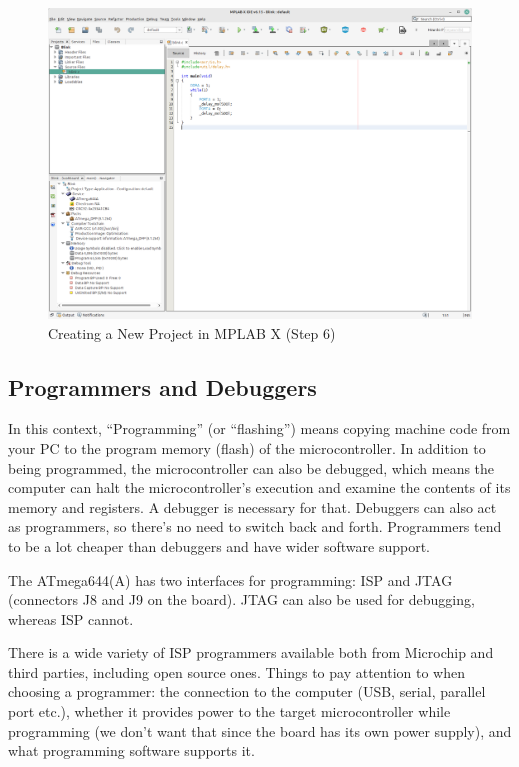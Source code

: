 \documentclass{article}
\begin{document}
\begin{figure}[htb]
\centering
\includegraphics[width=\textwidth]{Pictures/MPLABX6.png}
\caption{Creating a New Project in MPLAB X (Step 6)}
\label{fig:mplabx6}
\end{figure}
\FloatBarrier

\subsection{Programmers and Debuggers}\label{sec:programmers}
In this context, ``Programming'' (or ``flashing'') means copying machine code from your PC to the program memory (flash) of the microcontroller. In addition to being programmed, the microcontroller can also be debugged, which means the computer can halt the microcontroller's execution and examine the contents of its memory and registers. A debugger is necessary for that. Debuggers can also act as programmers, so there's no need to switch back and forth. Programmers tend to be a lot cheaper than debuggers and have wider software support. 

The ATmega644(A) has two interfaces for programming: ISP and JTAG (connectors J8 and J9 on the board). JTAG can also be used for debugging, whereas ISP cannot. 

There is a wide variety of ISP programmers available both from Microchip and third parties, including open source ones. Things to pay attention to when choosing a programmer: the connection to the computer (USB, serial, parallel port etc.), whether it provides power to the target microcontroller while programming (we don't want that since the board has its own power supply), and what programming software supports it. 
\end{document}
